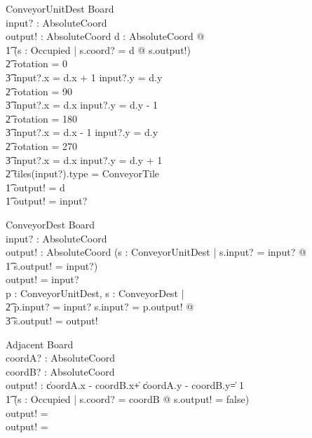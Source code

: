 \documentclass[12pt]{article}
\begin{document}
\begin{schema}{ConveyorUnitDest}
\Xi Board \\
input? : AbsoluteCoord \\
output! : AbsoluteCoord
\where
\forall d : AbsoluteCoord @ \\ \t1
\IF (\exists s : Occupied | s.coord? = d @ \neg s.output!) \; \; \wedge \\ \t2
rotation = 0 \Rightarrow \\ \t3 input?.x = d.x + 1 \wedge input?.y = d.y \\ \t2
rotation = 90 \Rightarrow \\ \t3 input?.x = d.x \wedge input?.y = d.y - 1
\\ \t2
rotation = 180 \Rightarrow \\ \t3 input?.x = d.x - 1 \wedge input?.y = d.y \\ \t2
rotation = 270 \Rightarrow \\ \t3 input?.x = d.x \wedge input?.y = d.y + 1 \\ \t2
tiles(input?).type = ConveyorTile \\ \t1
\THEN output! = d \\ \t1
\ELSE output! = input?
\end{schema}

\begin{schema}{ConveyorDest}
\Xi Board \\
input? : AbsoluteCoord \\
output! : AbsoluteCoord
\where
\IF (\exists s : ConveyorUnitDest | s.input? = input? @ \\ \t1 s.output! = input?) \\
\THEN output! = input? \\
\ELSE \forall p : ConveyorUnitDest, s : ConveyorDest | \\ \t2 p.input? = input? \wedge s.input? = p.output! @ \\ \t3 s.output! = output!
\end{schema}

\begin{schema}{Adjacent}
\Xi Board \\
coordA? : AbsoluteCoord \\
coordB? : AbsoluteCoord \\
output! : \bool
\where
\IF \|coordA.x - coordB.x\| + \|coordA.y - coordB.y\| = 1 \\ \t1
(\exists s : Occupied | s.coord? = coordB @ s.output! = false) \\
\THEN output! = \true \\
\ELSE output! = \false
\end{schema}
\end{document}
